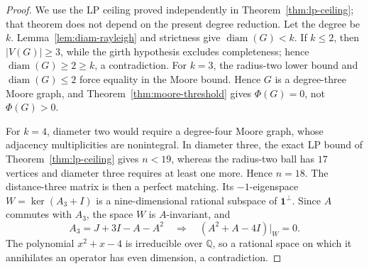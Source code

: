 \documentclass[a4paper,10pt,reqno]{amsart}
\theoremstyle{plain}
\theoremstyle{definition}
\theoremstyle{remark}
\newcommand{\one}{\mathbf 1}
\newcommand{\diam}{\operatorname{diam}}
\begin{document}
\begin{proof}
We use the LP ceiling proved independently in
Theorem~\ref{thm:lp-ceiling}; that theorem does not depend on the present
degree reduction.  Let the degree be \(k\).
Lemma~\ref{lem:diam-rayleigh} and strictness give \(\diam(G)<k\).
If \(k\le2\), then \(|V(G)|\ge3\), while the girth hypothesis excludes
completeness; hence \(\diam(G)\ge2\ge k\), a contradiction.  For \(k=3\), the
radius-two lower
bound and \(\diam(G)\le2\) force equality in the Moore bound.  Hence \(G\) is
a degree-three Moore graph, and Theorem~\ref{thm:moore-threshold} gives
\(\Phi(G)=0\), not \(\Phi(G)>0\).

For \(k=4\), diameter two would require a degree-four Moore graph, whose
adjacency multiplicities are nonintegral.  In diameter three, the exact LP
bound of Theorem~\ref{thm:lp-ceiling} gives \(n<19\), whereas the
radius-two ball has \(17\) vertices and diameter three requires at least one
more.  Hence \(n=18\).  The distance-three matrix is then a perfect matching.
Its \(-1\)-eigenspace \(W=\ker(A_3+I)\) is a nine-dimensional rational
subspace of \(\one^\perp\).  Since \(A\) commutes with \(A_3\), the space
\(W\) is \(A\)-invariant, and
\[
 A_3=J+3I-A-A^2
 \quad\Longrightarrow\quad
 (A^2+A-4I)|_W=0.
\]
The polynomial \(x^2+x-4\) is irreducible over \(\mathbb Q\), so a rational
space on which it annihilates an operator has even dimension, a contradiction.


\end{proof}
\end{document}
